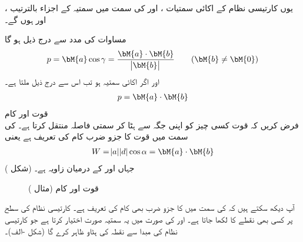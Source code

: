 یوں کارتیسی نظام کے اکائی سمتیات ،  اور  کی سمت میں سمتیہ  کے اجزاء بالترتیب ،  اور  ہوں گے۔

مساوات  کی مدد سے درج ذیل ہو گا
\begin{align}\label{مساوات_الجبرا_عمودی_سایہ_الف}
p=\bM{a}\cos \gamma=\frac{\bM{a}\cdot\bM{b}}{\abs{\bM{b}}} \quad \quad (\bM{b}\ne \bM{0})
\end{align}
اور اگر  اکائی سمتیہ ہو تب اس سے درج ذیل ملتا ہے۔
\begin{align}\label{مساوات_الجبرا_عمودی_سایہ_ب}
p=\bM{a}\cdot\bM{b}
\end{align}
\quad قوت اور کام\\
فرض کریں کہ قوت  کسی چیز کو اپنی جگہ سے ہٹا کر سمتی فاصلہ  منتقل کرتا ہے۔ کی سمت میں قوت کا جزو ضرب  کام  کی تعریف ہے یعنی
\begin{align}
W=\abs{a}\abs{d}\cos \alpha=\bM{a}\cdot \bM{b}
\end{align} 
جہاں  اور  کے درمیان زاویہ  ہے۔ (شکل )
\begin{figure}
\centering
{}
\caption{قوت اور کام (مثال )}
\label{شکل_مثال_الجبرا_قوت_کام}
\end{figure}

آپ دیکھ سکتے ہیں کہ  کی سمت میں  کا جزو ضرب  بھی کام کی تعریف ہے۔
کارتیسی نظام کی  سطح پر  کسی بھی نقطے کا     لکھا جاتا ہے۔ اور  کی صورت میں یہ سمتیہ  صورت اختیار کرتا ہے جو کارتیسی نظام کی مبدا سے نقطہ  کی ہٹاو ظاہر کرے گا (شکل -الف)۔

